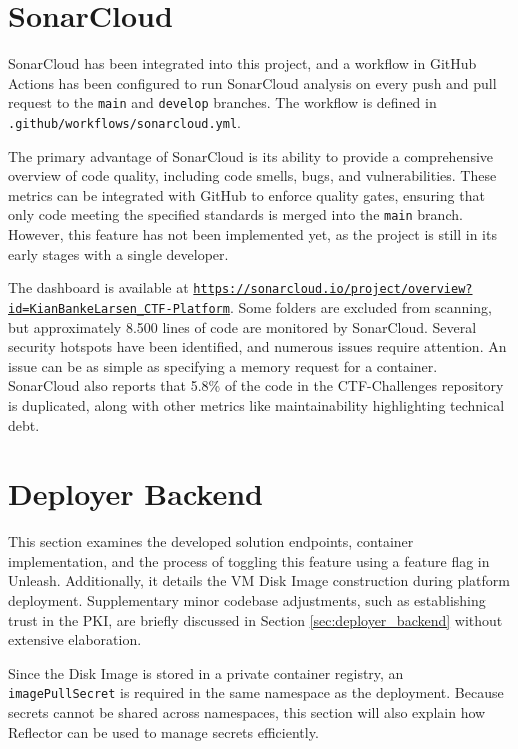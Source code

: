 \section{SonarCloud}
SonarCloud has been integrated into this project, and a workflow in GitHub Actions has been configured to run SonarCloud analysis on every push and pull request to the \texttt{main} and \texttt{develop} branches. The workflow is defined in \texttt{.github/workflows/sonarcloud.yml}. 

The primary advantage of SonarCloud is its ability to provide a comprehensive overview of code quality, including code smells, bugs, and vulnerabilities. These metrics can be integrated with GitHub to enforce quality gates, ensuring that only code meeting the specified standards is merged into the \texttt{main} branch. However, this feature has not been implemented yet, as the project is still in its early stages with a single developer.

The dashboard is available at \href{https://sonarcloud.io/project/overview?id=KianBankeLarsen_CTF-Platform}{\texttt{https://sonarcloud.io/project/overview?\allowbreak id=KianBankeLarsen\_CTF-Platform}}. Some folders are excluded from scanning, but approximately 8.500 lines of code are monitored by SonarCloud. Several security hotspots have been identified, and numerous issues require attention. An issue can be as simple as specifying a memory request for a container. SonarCloud also reports that 5.8\% of the code in the CTF-Challenges repository is duplicated, along with other metrics like maintainability highlighting technical debt.

\section{Deployer Backend}
This section examines the developed solution endpoints, container implementation, and the process of toggling this feature using a feature flag in Unleash. Additionally, it details the VM Disk Image construction during platform deployment. Supplementary minor codebase adjustments, such as establishing trust in the PKI, are briefly discussed in Section \ref{sec:deployer_backend} without extensive elaboration.

Since the Disk Image is stored in a private container registry, an \texttt{imagePullSecret} is required in the same namespace as the deployment. Because secrets cannot be shared across namespaces, this section will also explain how Reflector can be used to manage secrets efficiently.

